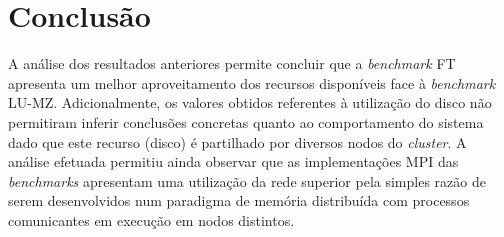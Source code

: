 \documentclass{article}
\begin{document}
\section{Conclusão}
\quad A análise dos resultados anteriores permite concluir que a \textit{benchmark} FT apresenta um melhor aproveitamento dos recursos disponíveis 
face à \textit{benchmark} LU-MZ. 
Adicionalmente, os valores obtidos referentes à utilização do disco não permitiram inferir conclusões concretas quanto ao comportamento do sistema
dado que este recurso (disco) é partilhado por diversos nodos do \textit{cluster}. A análise efetuada permitiu ainda observar que as implementações 
MPI das \textit{benchmarks} apresentam uma utilização da rede superior pela simples razão de serem desenvolvidos num paradigma de memória distribuída 
com processos comunicantes em execução em nodos distintos.

\printbibliography
\end{document}
